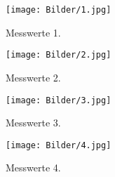 \label{sec:Anhang}
\begin{figure}
    \centering
    \texttt{[image: Bilder/1.jpg]}
    \caption{Messwerte 1.}
\end{figure}

\begin{figure}
    \centering
    \texttt{[image: Bilder/2.jpg]}
    \caption{Messwerte 2.}
\end{figure}

\begin{figure}
    \centering
    \texttt{[image: Bilder/3.jpg]}
    \caption{Messwerte 3.}
\end{figure}

\begin{figure}
    \centering
    \texttt{[image: Bilder/4.jpg]}
    \caption{Messwerte 4.}
\end{figure}